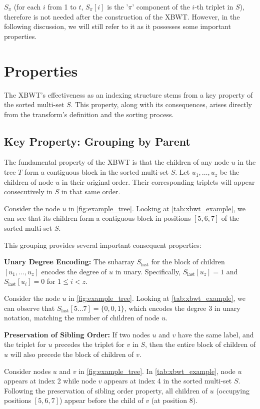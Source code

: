 $S_{\pi}$ (for each $i$ from 1 to $t$, $S_{\pi}[i]$ is the '$\pi$' component of the $i$-th triplet in $S$), therefore is not needed after the construction of the XBWT. However, in the following discussion, we will still refer to it as it possesses some important properties.

\section{Properties}
The XBWT's effectiveness as an indexing structure stems from a key property of the sorted multi-set $S$. This property, along with its consequences, arises directly from the transform's definition and the sorting process.

\subsection{Key Property: Grouping by Parent}

The fundamental property of the XBWT is that the children of any node $u$ in the tree $T$ form a contiguous block in the sorted multi-set $S$. Let $u_1, \dots, u_z$ be the children of node $u$ in their original order. Their corresponding triplets will appear consecutively in $S$ in that same order.
\begin{example}
    Consider the node $u$ in \cref{fig:example_tree}. Looking at \cref{tab:xbwt_example}, we can see that its children form a contiguous block in positions $[5, 6, 7]$ of the sorted multi-set $S$.
\end{example}

This grouping provides several important consequent properties:

\textbf{Unary Degree Encoding:} The subarray $S_{\text{last}}$ for the block of children $[u_1, \dots, u_z]$ encodes the degree of $u$ in unary. Specifically, $S_{\text{last}}[u_z] = 1$ and $S_{\text{last}}[u_i] = 0$ for $1 \leq i < z$. 
\begin{example}
    Consider the node $u$ in \cref{fig:example_tree}. Looking at \cref{tab:xbwt_example}, we can observe that $S_{\text{last}}[5 \dots 7] = \{0, 0, 1\}$, which encodes the degree 3 in unary notation, matching the number of children of node $u$.
\end{example}

\textbf{Preservation of Sibling Order:} If two nodes $u$ and $v$ have the same label, and the triplet for $u$ precedes the triplet for $v$ in $S$, then the entire block of children of $u$ will also precede the block of children of $v$.
\begin{example}
    Consider nodes $u$ and $v$ in \cref{fig:example_tree}. In \cref{tab:xbwt_example}, node $u$ appears at index 2 while node $v$ appears at index 4 in the sorted multi-set $S$. Following the preservation of sibling order property, all children of $u$ (occupying positions $[5, 6, 7]$) appear before the child of $v$ (at position $8$).
\end{example}

